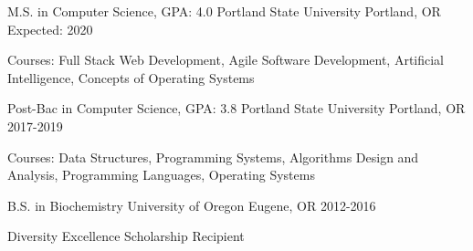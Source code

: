 
\begin{cventries}
  \cventry
    {M.S. in Computer Science, GPA: 4.0} %
    {Portland State University} %
    {Portland, OR} %
    {Expected: 2020} %
    {
      \begin{cvitems} %
         \item {Courses: Full Stack Web Development, Agile Software Development, Artificial Intelligence, Concepts of Operating Systems}
      \end{cvitems}
    }

  \cventry
  {Post-Bac in Computer Science, GPA: 3.8}
  {Portland State University}
  {Portland, OR}
  {2017-2019}
  {
    \begin{cvitems} %
    \item {Courses: Data Structures, Programming Systems, Algorithms Design and Analysis, Programming Languages, Operating Systems}
    \end{cvitems}
  }


  \cventry
  {B.S. in Biochemistry}
  {University of Oregon}
  {Eugene, OR}
  {2012-2016}
  {
      \begin{cvitems} %
         \item {Diversity Excellence Scholarship Recipient}
      \end{cvitems}
  }

\end{cventries}
